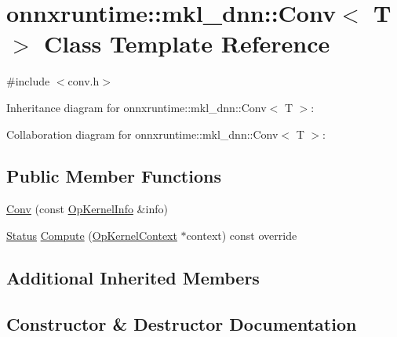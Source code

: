 \hypertarget{classonnxruntime_1_1mkl__dnn_1_1Conv}{}\section{onnxruntime\+:\+:mkl\+\_\+dnn\+:\+:Conv$<$ T $>$ Class Template Reference}
\label{classonnxruntime_1_1mkl__dnn_1_1Conv}


{\ttfamily \#include $<$conv.\+h$>$}



Inheritance diagram for onnxruntime\+:\+:mkl\+\_\+dnn\+:\+:Conv$<$ T $>$\+:


Collaboration diagram for onnxruntime\+:\+:mkl\+\_\+dnn\+:\+:Conv$<$ T $>$\+:
\subsection*{Public Member Functions}
\begin{DoxyCompactItemize}
\item 
\mbox{\hyperlink{classonnxruntime_1_1mkl__dnn_1_1Conv_adb1f473a1a436743c3453d21977b2f41}{Conv}} (const \mbox{\hyperlink{classonnxruntime_1_1OpKernelInfo}{Op\+Kernel\+Info}} \&info)
\item 
\mbox{\hyperlink{classonnxruntime_1_1common_1_1Status}{Status}} \mbox{\hyperlink{classonnxruntime_1_1mkl__dnn_1_1Conv_a8db02bc5e1f3cd5ac0935c7ff52dc935}{Compute}} (\mbox{\hyperlink{classonnxruntime_1_1OpKernelContext}{Op\+Kernel\+Context}} $\ast$context) const override
\end{DoxyCompactItemize}
\subsection*{Additional Inherited Members}


\subsection{Constructor \& Destructor Documentation}
\mbox{\label{classonnxruntime_1_1mkl__dnn_1_1Conv_adb1f473a1a436743c3453d21977b2f41}} 
